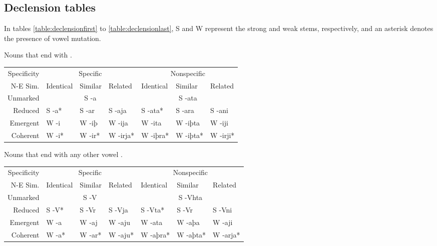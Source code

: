 \documentclass{book}
\begin{document}
\subsection{Declension tables}

In tables \ref{table:declensionfirst} to \ref{table:declensionlast}, S and W represent the strong and weak stems, respectively, and an asterisk denotes the presence of vowel mutation.

\begin{tablenf}
  \caption{Nouns that end with . \label{table:declensionfirst}}
  \centering
  \begin{tabular}{r|lll|lll}
    Specificity & \multicolumn{3}{c|}{Specific} & \multicolumn{3}{c}{Nonspecific} \\
    N-E \bs{} Sim. & Identical & Similar & Related & Identical & Similar & Related \\
    \hline
    Unmarked & \multicolumn{3}{c|}{S -a} & \multicolumn{3}{c}{S -ata} \\
    Reduced & S -a* & S -ar & S -aja & S -ata* & S -ara & S -ani \\
    Emergent & W -i & W -iþ & W -ija & W -ita & W -iþta & W -iji \\
    Coherent & W -i* & W -ir* & W -irja* & W -iþra* & W -iþta* & W -irji* \\
  \end{tabular}
\end{tablenf}

\begin{tablenf}
  \caption{Nouns that end with any other vowel .}
  \centering
  \begin{tabular}{r|lll|lll}
    Specificity & \multicolumn{3}{c|}{Specific} & \multicolumn{3}{c}{Nonspecific} \\
    N-E \bs{} Sim. & Identical & Similar & Related & Identical & Similar & Related \\
    \hline
    Unmarked & \multicolumn{3}{c|}{S -V} & \multicolumn{3}{c}{S -Vhta} \\
    Reduced & S -V* & S -Vr & S -Vja & S -Vta* & S -Vr & S -Vni \\
    Emergent & W -a & W -aj & W -aju & W -ata & W -aþa & W -aji \\
    Coherent & W -a* & W -ar* & W -aju* & W -aþra* & W -aþta* & W -arja* \\
  \end{tabular}
\end{tablenf}
\end{document}
